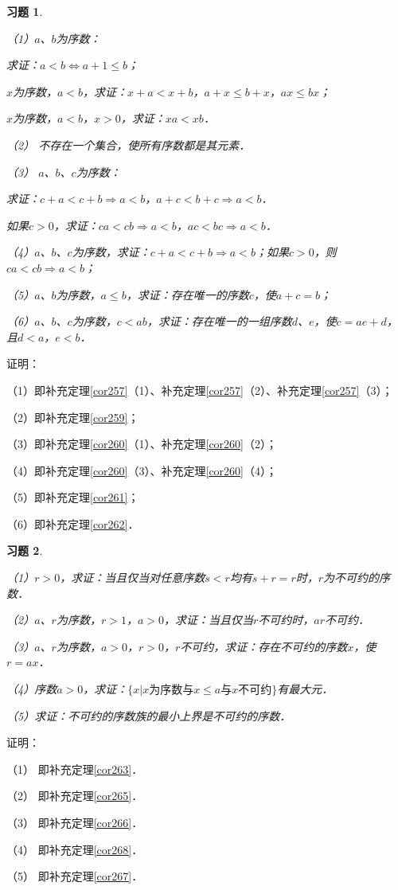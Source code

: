 \documentclass[12pt, a4paper, oneside]{book}
\newtheorem{exer}{习题}
\begin{document}
			\begin{exer}\label{exer115}
				\hfill\par
				（1）$a$、$b$为序数：
				\par
				求证：$a<b\Leftrightarrow a+1\leq b$；
				\par
				$x$为序数，$a<b$，求证：$x+a<x+b$，$a+x\leq b+x$，$ax\leq bx$；
				\par
				$x$为序数，$a<b$，$x>0$，求证：$xa<xb$．
				\par
				（2）	不存在一个集合，使所有序数都是其元素．
				\par
				（3）	$a$、$b$、$c$为序数：
				\par
				求证：$c+a<c+b\Rightarrow a<b$，$a+c<b+c\Rightarrow a<b$．
				\par
				如果$c>0$，求证：$ca<cb\Rightarrow a<b$，$ac<bc\Rightarrow a<b$．
				\par
				（4）$a$、$b$、$c$为序数，求证：$c+a<c+b\Rightarrow a<b$；如果$c>0$，则$ca<cb\Rightarrow a<b$；
				\par
				（5）$a$、$b$为序数，$a\leq b$，求证：存在唯一的序数$c$，使$a+c=b$；
				\par
				（6）$a$、$b$、$c$为序数，$c<ab$，求证：存在唯一的一组序数$d$、$e$，使$c=ae+d$，且$d<a$，$e<b$．
			\end{exer}
			证明：
			\par
			（1）即补充定理\ref{cor257}（1）、补充定理\ref{cor257}（2）、补充定理\ref{cor257}（3）；
			\par
			（2）即补充定理\ref{cor259}；
			\par
			（3）即补充定理\ref{cor260}（1）、补充定理\ref{cor260}（2）；
			\par
			（4）即补充定理\ref{cor260}（3）、补充定理\ref{cor260}（4）；
			\par
			（5）即补充定理\ref{cor261}；
			\par
			（6）即补充定理\ref{cor262}．
			
			\begin{exer}\label{exer116}
				\hfill\par
				（1）$r>0$，求证：当且仅当对任意序数$s<r$均有$s+r=r$时，$r$为不可约的序数．
				\par
				（2）$a$、$r$为序数，$r>1$，$a>0$，求证：当且仅当$r$不可约时，$ar$不可约．
				\par
				（3）$a$、$r$为序数，$a>0$，$r>0$，$r$不可约，求证：存在不可约的序数$x$，使$r=ax$．
				\par
				（4）序数$a>0$，求证：$\{x|x\text{为序数}\text{与}x\leq a\text{与}x\text{不可约}\}$有最大元．
				\par
				（5）求证：不可约的序数族的最小上界是不可约的序数．
			\end{exer}
			证明：
			\par
			（1）	即补充定理\ref{cor263}．
			\par
			（2）	即补充定理\ref{cor265}．
			\par
			（3）	即补充定理\ref{cor266}．
			\par
			（4）	即补充定理\ref{cor268}．
			\par
			（5）	即补充定理\ref{cor267}．
\end{document}
